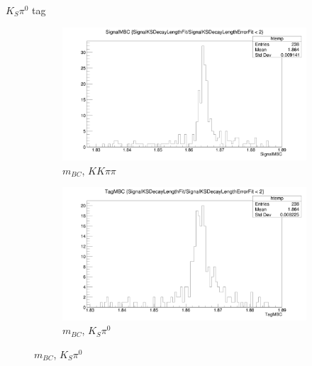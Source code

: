 \documentclass{beamer}
\begin{document}
\begin{frame}{$K_S\pi^0$ tag}
  \begin{figure}
    \centering
    \begin{subfigure}{0.5\textwidth}
      \centering
      \includegraphics[width=\textwidth]{KSpi0DoubleTag_SignalMBC.png}
      \caption{$m_{BC}$, $KK\pi\pi$}
    \end{subfigure}%
    \begin{subfigure}{0.5\textwidth}
      \centering
      \includegraphics[width=\textwidth]{KSpi0DoubleTag_TagMBC.png}
      \caption{$m_{BC}$, $K_S\pi^0$}
    \end{subfigure}
  \end{figure}
\end{frame}
\end{document}
